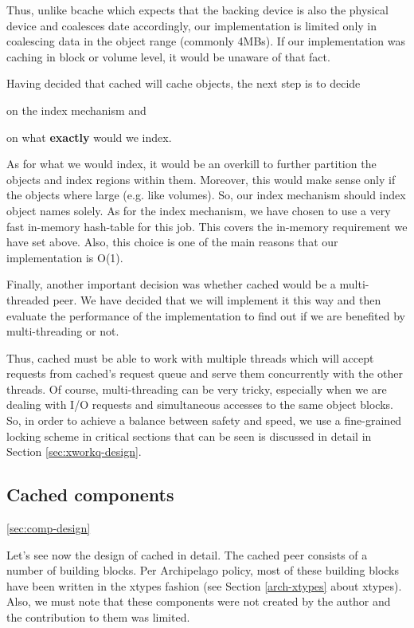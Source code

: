 Thus, unlike bcache which expects that the backing device is also the physical 
device and coalesces date accordingly, our implementation is limited only in 
coalescing data in the object range (commonly 4MBs). If our implementation was 
caching in block or volume level, it would be unaware of that fact. 

Having decided that cached will cache objects, the next step is to decide
\begin{inparaenum}[i)]
\item on the index mechanism and
\item on what \textbf{exactly} would we index.
\end{inparaenum}

As for what we would index, it would be an overkill to further partition the 
objects and index regions within them. Moreover, this would make sense only if 
the objects where large (e.g. like volumes). So, our index mechanism should 
index object names solely. As for the index mechanism, we have chosen to use a 
very fast in-memory hash-table for this job. This covers the in-memory 
requirement we have set above. Also, this choice is one of the main reasons 
that our implementation is O(1).

Finally, another important decision was whether cached would be a 
multi-threaded peer. We have decided that we will implement it this way and 
then evaluate the performance of the implementation to find out if we are 
benefited by multi-threading or not.

Thus, cached must be able to work with multiple threads which will accept 
requests from cached's request queue and serve them concurrently with the other 
threads. Of course, multi-threading can be very tricky, especially when we are 
dealing with I/O requests and simultaneous accesses to the same object blocks.  
So, in order to achieve a balance between safety and speed, we use a
fine-grained locking scheme in critical sections that can be seen is discussed 
in detail in Section \ref{sec:xworkq-design}.

\subsection{Cached components}\ref{sec:comp-design}

Let's see now the design of cached in detail. The cached peer consists of a 
number of building blocks.  Per Archipelago policy, most of these building 
blocks have been written in the xtypes fashion (see Section \ref{arch-xtypes} 
about xtypes). Also, we must note that these components were not created by the 
author and the contribution to them was limited.

